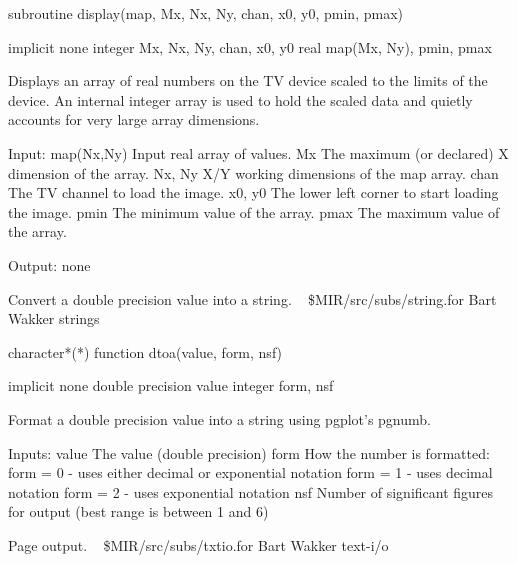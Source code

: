 \par{\tenpoint
{\eightpoint\begintt
      subroutine display(map, Mx, Nx, Ny, chan, x0, y0, pmin, pmax)

      implicit none
      integer Mx, Nx, Ny, chan, x0, y0
      real map(Mx, Ny), pmin, pmax

  Displays an array of real numbers on the TV device scaled to the
  limits of the device.  An internal integer array is used to hold
  the scaled data and quietly accounts for very large array
  dimensions.

  Input:
    map(Nx,Ny)   Input real array of values.
    Mx           The maximum (or declared) X dimension of the array.
    Nx, Ny       X/Y working dimensions of the map array.
    chan         The TV channel to load the image.
    x0, y0       The lower left corner to start loading the image.
    pmin         The minimum value of the array.
    pmax         The maximum value of the array.

  Output:
    none
\endtt}
\par}
%
\noindent Convert a double precision value into a string.
\newline \ 
\newline {} \$MIR/src/subs/string.for
\newline {} Bart Wakker
\newline {} strings
\par{\tenpoint
{\eightpoint\begintt
      character*(*) function dtoa(value, form, nsf)

      implicit none
      double precision value
      integer form, nsf

  Format a double precision value into a string using pgplot's pgnumb.

  Inputs:
    value         The value (double precision)
    form          How the number is formatted:
                    form = 0 - uses either decimal or
                               exponential notation
                    form = 1 - uses decimal notation
                    form = 2 - uses exponential notation
    nsf           Number of significant figures for output
                    (best range is between 1 and 6)
\endtt}
\par}
%
\noindent Page output.
\newline \ 
\newline {} \$MIR/src/subs/txtio.for
\newline {} Bart Wakker
\newline \abox{Keywords:} text-i/o
